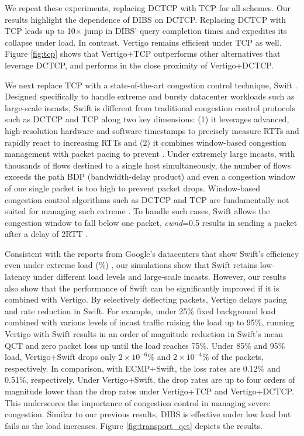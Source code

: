 We repeat these experiments, replacing DCTCP with TCP for all schemes. 
Our results highlight the dependence of DIBS on DCTCP. Replacing DCTCP with TCP leads up to 10$\times$ jump in DIBS' query completion times and expedites its collapse under load. In contrast, Vertigo remains efficient under TCP as well. Figure \ref{fig:tcp} shows that Vertigo+TCP outperforms other alternatives that leverage DCTCP, and performs in the close proximity of Vertigo+DCTCP.

We next replace TCP with a state-of-the-art congestion control technique, Swift \cite{swift}. Designed specifically to handle extreme and bursty datacenter workloads such as large-scale incasts, Swift is different from traditional congestion control protocols such as DCTCP and TCP along two key dimensions: (1) it leverages advanced, high-resolution hardware and software timestamps to precisely measure RTTs and rapidly react to increasing RTTs and (2) it combines window-based congestion management with packet pacing to prevent \bursts. Under extremely large incasts, with thousands of flows destined to a single host simultaneously, the number of flows exceeds the path BDP (bandwidth-delay product) and even a congestion window of one single packet is too high to prevent packet drops. Window-based congestion control algorithms such as DCTCP and TCP are fundamentally not suited for managing such extreme \bursts. To handle such cases, Swift allows the congestion window to fall below one packet, \eg \emph{cwnd}=0.5 results in sending a packet after a delay of 2RTT \cite{swift}.

Consistent with the reports from Google's datacenters that show Swift's efficiency even under extreme load (\%) \cite{swift}, our simulations show that Swift retains low-latency under different load levels and large-scale incasts. However, our results also show that the performance of Swift can be significantly improved if it is combined with Vertigo. By selectively deflecting packets, Vertigo delays pacing and rate reduction in Swift. For example, under 25\% fixed background load combined with various levels of incast traffic raising the load up to 95\%, running Vertigo with Swift results in an order of magnitude reduction in Swift's mean QCT and zero packet loss up until the load reaches 75\%. Under 85\% and 95\% load, Vertigo+Swift drops only $2{\times}10^{-6}$\% and $2{\times}10^{-4}$\% of the packets, respectively. In comparison, with ECMP+Swift, the loss rates are 0.12\% and 0.51\%, respectively.
Under Vertigo+Swift, the drop rates are up to four orders of magnitude lower than the drop rates under Vertigo+TCP and Vertigo+DCTCP. This underscores the importance of congestion control in managing severe congestion. Similar to our previous results, DIBS is effective under low load but fails as the load increases. Figure \ref{fig:transport_qct} depicts the results.

